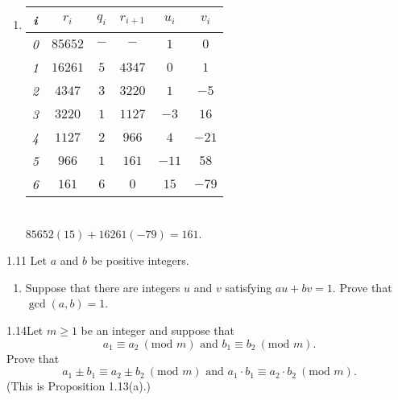 {\begin{enumerate}
    \item 
    
    \begin{tabular}{c|c|c|c|c|c}
        \textit{i} & \textit{$r_i$} & \textit{$q_i$} & $r_{i + 1}$ & \textit{$u_i$} & \textit{$v_i$} \\ \hline
        \textit{0} & $85652$ & $-$ & $-$ & $1$ & $0$ \\ \hline
        \textit{1} & $16261$ & $5$ & $4347$ & $0$ & $1$ \\ \hline
        \textit{2} & $4347$ & $3$ & $3220$ & $1$ & $-5$ \\ \hline
        \textit{3} & $3220$ & $1$ & $1127$ & $-3$ & $16$ \\ \hline
        \textit{4} & $1127$ & $2$ & $966$ & $4$ & $-21$ \\ \hline
        \textit{5} & $966$ & $1$ & $161$ & $-11$ & $58$ \\ \hline
        \textit{6} & $161$ & $6$ & $0$ & $15$ & $-79$ \\
    \end{tabular} \\

    $85652(15) + 16261(-79) = 161$.    
\end{enumerate}
}

\begin{exercise}
    {1.11} Let $a$ and $b$ be positive integers.
    \begin{enumerate}
        \item Suppose that there are integers $u$ and $v$ satisfying $au + bv = 1$. Prove that $\gcd(a, b) = 1$.
    \end{enumerate}
\end{exercise}


\begin{exercise}
    {1.14}Let $m \geq 1$ be an integer and suppose that $$a_1 \equiv a_2 \ (\text{mod } m) \text{ and } b_1 \equiv b_2 \ (\text{mod } m).$$ Prove that $$a_1 \pm b_1 \equiv a_2 \pm b_2 \ (\text{mod } m) \text{ and } a_1 \cdot b_1 \equiv a_2 \cdot b_2 \ (\text{mod } m).$$ (This is Proposition 1.13(a).)
\end{exercise}


